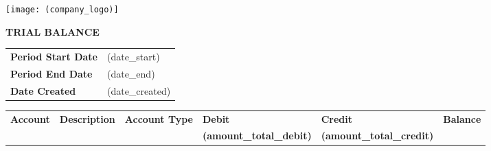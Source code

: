 \documentclass[english]{article}
\providecommand{\tabularnewline}{\\}
\begin{document}
\noindent \texttt{[image: (company\_logo)]}

\noindent \vspace{10mm}


\noindent \textbf{TRIAL BALANCE}

\noindent \vspace{10mm}


\noindent \begin{tabular}{ll}
\textbf{Period Start Date} & (date\_start) \tabularnewline
\textbf{Period End Date} & (date\_end) \tabularnewline
\textbf{Date Created} & (date\_created) \tabularnewline
\end{tabular}

\noindent \vspace{10mm}

\noindent \begin{tabular}{>{\raggedright}p{}>{\raggedright}p{}>{\raggedright}p{}>{\raggedright}p{}>{\raggedright}p{}>{\raggedright}p{}}
\cline{1-6} 
\textbf{Account} & \textbf{Description} & \textbf{Account Type} & \textbf{Debit} & \textbf{Credit} & \textbf{Balance}\tabularnewline
\cline{1-6} 
\cline{1-6} 
 & & & \textbf{(amount\_total\_debit)} & \textbf{(amount\_total\_credit)} & \tabularnewline
\cline{1-6} 
\end{tabular}

\noindent \vspace{5mm}
\end{document}
